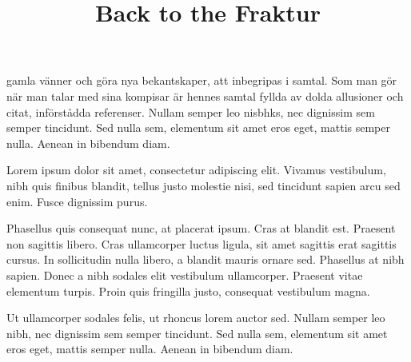 

\Arno\currvar
\title{Back to the Fraktur}

\vskip0pt



\baselineskip

\noindent
gamla vänner och göra nya bekantskaper, att inbegripas i samtal. Som man gör när man talar med sina kompisar är hennes samtal fyllda av dolda allusioner och citat, införstådda referenser. 
Nullam semper leo nisbhks, nec dignissim sem semper tincidunt. Sed nulla sem, elementum sit amet eros eget, mattis semper nulla. Aenean in bibendum diam.

Lorem ipsum dolor sit amet, consectetur adipiscing elit. Vivamus vestibulum, nibh quis finibus blandit, tellus justo molestie nisi, sed tincidunt sapien arcu sed enim. Fusce dignissim purus. 

Phasellus quis consequat nunc, at placerat ipsum. Cras at blandit est. Praesent non sagittis libero. Cras ullamcorper luctus ligula, sit amet sagittis erat sagittis cursus. In sollicitudin nulla libero, a blandit mauris ornare sed. Phasellus at nibh sapien. Donec a nibh sodales elit vestibulum ullamcorper. Praesent vitae elementum turpis. Proin quis fringilla justo, consequat vestibulum magna. 

Ut ullamcorper sodales felis, ut rhoncus lorem auctor sed. Nullam semper leo nibh, nec dignissim sem semper tincidunt. Sed nulla sem, elementum sit amet eros eget, mattis semper nulla. Aenean in bibendum diam.

